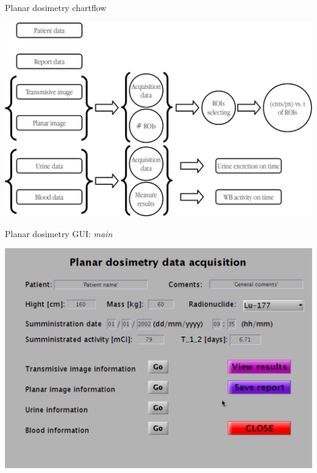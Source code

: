 \documentclass[ignorenonframetext,]{beamer}
\begin{document}
\begin{frame}{Planar dosimetry chartflow}
\protect\hypertarget{planar-dosimetry-chartflow}{}

\includegraphics{imgs/planar-chartflow.png}

\end{frame}

\begin{frame}{Planar dosimetry GUI: \emph{main}}
\protect\hypertarget{planar-dosimetry-gui-main}{}

\includegraphics{imgs/planar-gui.png}

\end{frame}
\end{document}

